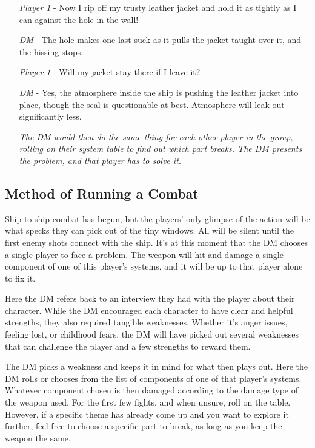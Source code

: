 \documentclass[a4paper]{article}
\begin{document}
\begin{enumerate}[leftmargin=2cm]
\item [\textit{Player 1}] - Now I rip off my trusty leather jacket and hold it as tightly as I can against the hole in the wall!
\item [\textit{DM}] - The hole makes one last suck as it pulls the jacket taught over it, and the hissing stops.
\item [\textit{Player 1}] - Will my jacket stay there if I leave it? 
\item [\textit{DM}] - Yes, the atmosphere inside the ship is pushing the leather jacket into place, though the seal is questionable at best. Atmosphere will leak out significantly less.
\item [] \textit{The DM would then do the same thing for each other player in the group, rolling on their system table to find out which part breaks. The DM presents the problem, and that player has to solve it.}
\end{enumerate}

\subsection{Method of Running a Combat}

Ship-to-ship combat has begun, but the players' only glimpse of the action will be what specks they can pick out of the tiny windows. All will be silent until the first enemy shots connect with the ship. It's at this moment that the DM chooses a single player to face a problem. The weapon will hit and damage a single component of one of this player's systems, and it will be up to that player alone to fix it.

Here the DM refers back to an interview they had with the player about their character. While the DM encouraged each character to have clear and helpful strengths, they also required tangible weaknesses. Whether it's anger issues, feeling lost, or childhood fears, the DM will have picked out several weaknesses that can challenge the player and a few strengths to reward them.

The DM picks a weakness and keeps it in mind for what then plays out. Here the DM rolls or chooses from the list of components of one of that player's systems. Whatever component chosen is then damaged according to the damage type of the weapon used. For the first few fights, and when unsure, roll on the table. However, if a specific theme has already come up and you want to explore it further, feel free to choose a specific part to break, as long as you keep the weapon the same.
\end{document}

